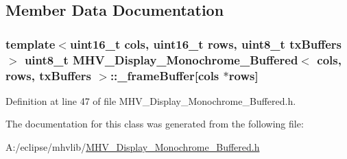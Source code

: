 \subsection{Member Data Documentation}
\hypertarget{class_m_h_v___display___monochrome___buffered_a8cca00a948839269e89b4ede9d314ad8}{
\subsubsection[{\-\_\-frame\-Buffer}]{\setlength{\rightskip}{0pt plus 5cm}template$<$uint16\-\_\-t cols, uint16\-\_\-t rows, uint8\-\_\-t tx\-Buffers$>$ uint8\-\_\-t {\bf M\-H\-V\-\_\-\-Display\-\_\-\-Monochrome\-\_\-\-Buffered}$<$ cols, rows, tx\-Buffers $>$\-::\-\_\-frame\-Buffer\mbox{[}cols $\ast$rows\mbox{]}\hspace{0.3cm}{\ttfamily [protected]}}}\label{class_m_h_v___display___monochrome___buffered_a8cca00a948839269e89b4ede9d314ad8}


Definition at line 47 of file M\-H\-V\-\_\-\-Display\-\_\-\-Monochrome\-\_\-\-Buffered.\-h.



The documentation for this class was generated from the following file\-:\begin{DoxyCompactItemize}
\item 
A\-:/eclipse/mhvlib/\hyperlink{_m_h_v___display___monochrome___buffered_8h}{M\-H\-V\-\_\-\-Display\-\_\-\-Monochrome\-\_\-\-Buffered.\-h}\end{DoxyCompactItemize}
